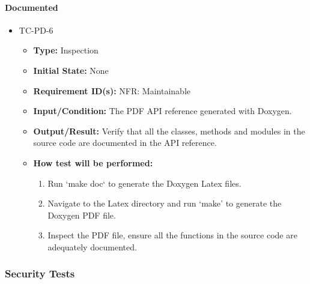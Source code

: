 \documentclass[12pt, titlepage]{article}
\begin{document}
\paragraph{Documented}
\begin{itemize}
\item{TC-PD-6\\}
\begin{itemize}
\item{\textbf{Type:}} Inspection
					
\item{\textbf{Initial State:}} None

\item{\textbf{Requirement ID(s):}} NFR: Maintainable
					
\item{\textbf{Input/Condition:}}  The PDF API reference generated with Doxygen.
					
\item{\textbf{Output/Result:}} Verify that all the classes, methods and modules in the source
code are documented in the API reference.

\item{\textbf{How test will be performed:}}  
\begin{enumerate}
\item Run `make doc` to generate the Doxygen Latex files.
\item Navigate to the Latex directory and run `make' to generate the Doxygen PDF file.
\item Inspect the PDF file, ensure all the functions in the source code are adequately documented. 
\end {enumerate}
\end{itemize}
\end{itemize}

\subsubsection{Security Tests}
\end{document}
